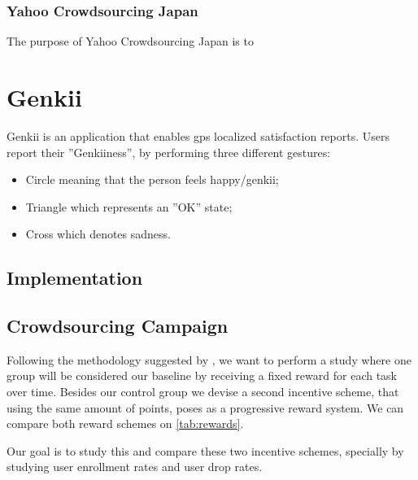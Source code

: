 \documentclass[letterpaper]{article}
\begin{document}
\subsubsection{Yahoo Crowdsourcing Japan}

The purpose of Yahoo Crowdsourcing Japan is to 


\section{Genkii}


Genkii is an application that enables gps localized satisfaction reports. Users report their ''Genkiiness'', by performing three different gestures:

\begin{itemize}
	\item Circle meaning that the person feels happy/genkii;
	\item Triangle which represents an ''OK'' state;
	\item Cross which denotes sadness.
\end{itemize}





\subsection{Implementation}




\subsection{Crowdsourcing Campaign}

Following the methodology suggested by \cite{Choi2014}, we want to perform a study where one group will be considered our baseline by receiving a fixed reward for each task over time.
Besides our control group we devise a second incentive scheme, that using the same amount of points, poses as a progressive reward system. We can compare both reward schemes on \ref{tab:rewards}.

Our goal is to study this and compare these two incentive schemes, specially by studying user enrollment rates and user drop rates.
 
\end{document}

